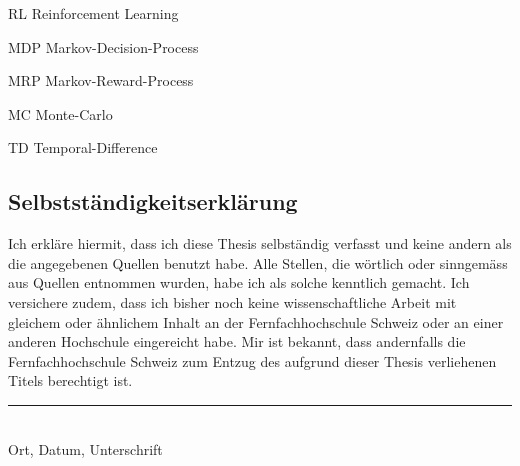 \documentclass{ffhsthesis}
\begin{document}
\tableofcontents


\begin{abkuerzungen}[MUSTER] %
\item[RL] Reinforcement Learning
\item[MDP] Markov-Decision-Process
\item[MRP] Markov-Reward-Process
\item[MC] Monte-Carlo
\item[TD] Temporal-Difference
\end{abkuerzungen}


\startThesis %










\listoffigures

\listoftables






\newpage


\begin{appendix}


\chapter*{Selbstständigkeitserklärung}
Ich erkläre hiermit, dass ich diese Thesis selbständig verfasst 
und keine andern als die angegebenen Quellen benutzt habe. 
Alle Stellen, die wörtlich oder sinngemäss aus Quellen entnommen wurden, 
habe ich als solche kenntlich gemacht. Ich versichere zudem, dass ich bisher 
noch keine wissenschaftliche Arbeit mit gleichem oder ähnlichem Inhalt an der 
Fernfachhochschule Schweiz oder an einer anderen Hochschule eingereicht habe. 
Mir ist bekannt, dass andernfalls die Fernfachhochschule Schweiz zum Entzug 
des aufgrund dieser Thesis verliehenen Titels berechtigt ist.

\vspace{4cm}
\noindent
\hrule \ \\[-0.5ex]
Ort, Datum, Unterschrift
\end{appendix}
\end{document}
